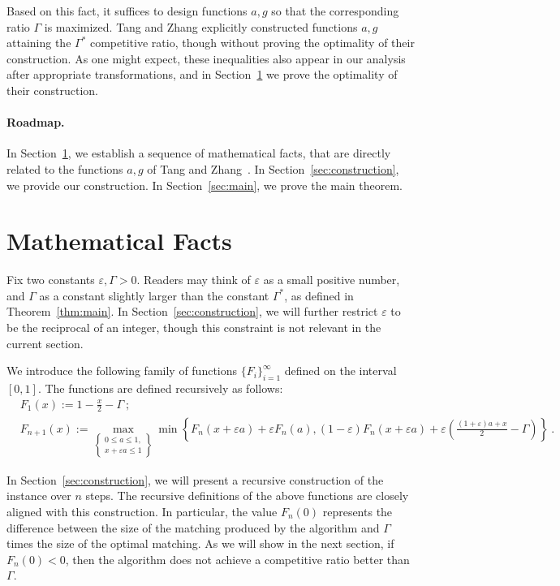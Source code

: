 \documentclass[11pt,letterpaper]{article}
\newcommand{\eps}{\varepsilon}
\begin{document}
Based on this fact, it suffices to design functions $a,g$ so that the corresponding ratio $\Gamma$ is maximized. Tang and Zhang explicitly constructed functions $a,g$ attaining the $\Gamma^*$ competitive ratio, though without proving the optimality of their construction. As one might expect, these inequalities also appear in our analysis after appropriate transformations, and in Section~\ref{sec:math} we prove the optimality of their construction.
\paragraph{Roadmap.} In Section~\ref{sec:math}, we establish a sequence of mathematical facts, that are directly related to the functions $a,g$ of Tang and Zhang~\cite{ec/TangZ24}. In Section~\ref{sec:construction}, we provide our construction. In Section~\ref{sec:main}, we prove the main theorem. 

\section{Mathematical Facts}
\label{sec:math}

Fix two constants $\eps, \Gamma > 0$. Readers may think of $\eps$ as a small positive number, and $\Gamma$ as a constant slightly larger than the constant $\Gamma^*$, as defined in Theorem~\ref{thm:main}. In Section~\ref{sec:construction}, we will further restrict $\varepsilon$ to be the reciprocal of an integer, though this constraint is not relevant in the current section.

We introduce the following family of functions $\{F_i\}_{i=1}^{\infty}$ defined on the interval $[0,1]$. The functions are defined recursively as follows:
\begin{align*}
& F_1(x):= 1-\frac{x}{2}-\Gamma~; \\
& F_{n+1}(x) := \max_{ \left\{ \substack{0\le a\le 1, \\ x+\eps a\le 1} \right\}} \min \left\{ F_n(x+\eps a) + \eps F_n(a), (1-\eps) F_n(x+\eps a)+ \eps \left(\frac{(1+\eps)a + x}{2} - \Gamma \right) \right\}~.
\end{align*}

In Section~\ref{sec:construction}, we will present a recursive construction of the instance over $n$ steps. The recursive definitions of the above functions are closely aligned with this construction. In particular, the value $F_n(0)$ represents the difference between the size of the matching produced by the algorithm and $\Gamma$ times the size of the optimal matching. As we will show in the next section, if $F_n(0) < 0$, then the algorithm does not achieve a competitive ratio better than $\Gamma$.
\end{document}
